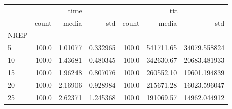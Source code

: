 \begin{tabular}{lrrrrrr}
\toprule
{} & \multicolumn{3}{c}{time} & \multicolumn{3}{c}{ttt} \\
{} &  count &    media &       std &  count &      media &           std \\
NREP &        &          &           &        &            &               \\
\midrule
5    &  100.0 &  1.01077 &  0.332965 &  100.0 &  541711.65 &  34079.558824 \\
10   &  100.0 &  1.43681 &  0.480345 &  100.0 &  342630.67 &  20683.481933 \\
15   &  100.0 &  1.96248 &  0.807076 &  100.0 &  260552.10 &  19601.194839 \\
20   &  100.0 &  2.16906 &  0.928984 &  100.0 &  215671.28 &  16023.596047 \\
25   &  100.0 &  2.62371 &  1.245368 &  100.0 &  191069.57 &  14962.044912 \\
\bottomrule
\end{tabular}

